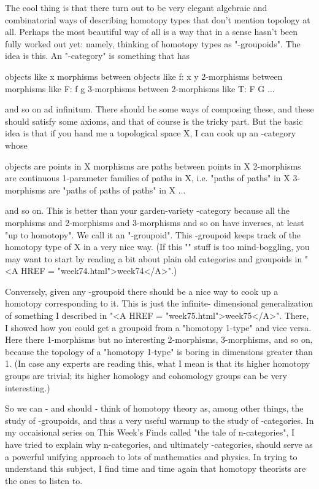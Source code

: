 The cool thing is that there turn out to be very elegant algebraic and
combinatorial ways of describing homotopy types that don't mention
topology at all.  Perhaps the most beautiful way of all is a way that
in a sense hasn't been fully worked out yet: namely, thinking of
homotopy types as "\omega -groupoids".  The idea is this.  An
"\omega -category" is something that has

     objects like x
     morphisms between objects like f: x \to  y
     2-morphisms between morphisms like F: f \to  g
     3-morphisms between 2-morphisms like T: F \to  G
     ...

and so on ad infinitum.  There should be some ways of composing these,
and these should satisfy some axioms, and that of course is the tricky
part.  But the basic idea is that if you hand me a topological space
X, I can cook up an \omega -category whose

    objects are points in X
    morphisms are paths between points in X
    2-morphisms are continuous 1-parameter families of paths in X, i.e. 
    "paths of paths" in X
    3-morphisms are "paths of paths of paths" in X
    ...

and so on.  This is better than your garden-variety \omega -category
because all the morphisms and 2-morphisms and 3-morphisms and so on
have inverses, at least "up to homotopy".  We call it an
"\omega -groupoid".  This \omega -groupoid keeps track of the homotopy
type of X in a very nice way.  (If this "\omega " stuff is too
mind-boggling, you may want to start by reading a bit about plain old
categories and groupoids in "<A HREF = "week74.html">week74</A>".)

Conversely, given any \omega -groupoid there should be a nice way to
cook up a homotopy corresponding to it.  This is just the infinite-
dimensional generalization of something I described in "<A HREF = "week75.html">week75</A>".
There, I showed how you could get a groupoid from a "homotopy 1-type"
and vice versa.  Here there 1-morphisms but no interesting
2-morphisms, 3-morphisms, and so on, because the topology of a
"homotopy 1-type" is boring in dimensions greater than 1.  (In case
any experts are reading this, what I mean is that its higher homotopy
groups are trivial; its higher homology and cohomology groups can be
very interesting.)

So we can - and should - think of homotopy theory as, among other
things, the study of \omega -groupoids, and thus a very useful warmup
to the study of \omega -categories.  In my occaisional series on This
Week's Finds called "the tale of n-categories", I have tried to explain
why n-categories, and ultimately \omega -categories, should serve as 
a powerful unifying approach to lots of mathematics and physics.  
In trying to understand this subject, I find time and time again that
homotopy theorists are the ones to listen to.

